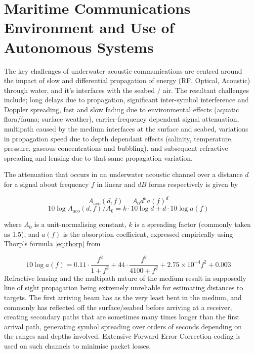 \def\ChapterTitle{Maritime Communications Environment and Use of Autonomous Systems}

\ifx\ifthesis\undefined

\else
\chapter{\ChapterTitle}
\label{Chapter\thechapter}
\fi

The key challenges of underwater acoustic communications are centred around the impact of slow and differential propagation of energy (RF, Optical, Acoustic) through water, and it's interfaces with the seabed / air.
The resultant challenges include; long delays due to propagation, significant inter-symbol interference and Doppler spreading, fast and slow fading due to environmental effects (aquatic flora/fauna; surface weather), carrier-frequency dependent signal attenuation, multipath caused by the medium interfaces at the surface and seabed, variations in propagation speed due to depth dependant effects (salinity, temperature, pressure, gaseous concentrations and bubbling), and subsequent refractive spreading and lensing due to that same propagation variation\cite{Partan2006}.

The attenuation that occurs in an underwater acoustic channel over a distance $d$ for a signal about frequency $f$ in linear and $dB$ forms respectively is given by

\begin{equation}
  \label{eq:acoattenuation}
  A_{\text{aco}}(d,f) = A_0d^ka(f)^d
\end{equation}
\begin{equation}
  \label{eq:acoattenuationdb}
  10 \log A_{\text{aco}}(d,f)/A_0 = k \cdot 10 \log d + d \cdot 10 \log a(f)
\end{equation}

where $A_0$ is a unit-normalising constant, $k$ is a spreading factor (commonly taken as 1.5), and $a(f)$ is the absorption coefficient, expressed empirically using Thorp's formula \eqref{eq:thorp} from \cite{Stojanovic2007}

\begin{equation}
  \label{eq:thorp}
  10 \log a(f) = 0.11 \cdot \frac{f^2}{1+f^2} + 44\cdot\frac{f^2}{4100+f^2}+ 2.75\times10^{-4} f^2 + 0.003
\end{equation}
%
Refractive lensing and the multipath nature of the medium result in supposedly line of sight propagation being extremely unreliable for estimating distances to targets.
The first arriving beam has as the very least bent in the medium, and commonly has reflected off the surface/seabed before arriving at a receiver, creating secondary paths that are sometimes many times longer than the first arrival path, generating symbol spreading over orders of seconds depending on the ranges and depths involved.
Extensive Forward Error Correction coding is used on such channels to minimise packet losses.

